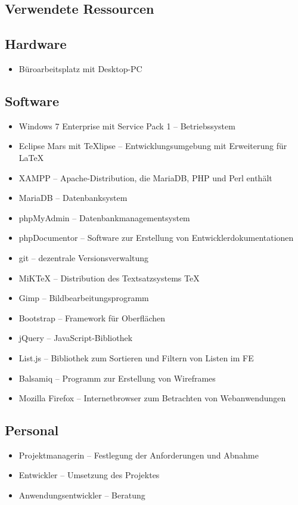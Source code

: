 \subsection{Verwendete Ressourcen}
\label{app:Verwendete Ressourcen}

\subsection*{Hardware}
\begin{itemize}
	\item Büroarbeitsplatz mit Desktop-PC
\end{itemize}

\subsection*{Software}
\begin{itemize}
	\item Windows 7 Enterprise mit Service Pack 1 -- Betriebssystem
	\item Eclipse Mars mit TeXlipse -- Entwicklungsumgebung mit Erweiterung für
	\LaTeX
	\item \acs{XAMPP} -- Apache-Distribution, die MariaDB, PHP und Perl enthält
	\item MariaDB -- Datenbanksystem
	\item phpMyAdmin -- Datenbankmanagementsystem
	\item phpDocumentor -- Software zur Erstellung von Entwicklerdokumentationen
	\item git -- dezentrale Versionsverwaltung
	\item MiKTeX -- Distribution des Textsatzsystems \TeX
	\item Gimp -- Bildbearbeitungsprogramm
	\item Bootstrap -- Framework für Oberflächen 
	\item jQuery -- JavaScript-Bibliothek
	\item List.js -- Bibliothek zum Sortieren und Filtern von Listen im \acs{FE}
	\item Balsamiq -- Programm zur Erstellung von Wireframes
	\item Mozilla Firefox -- Internetbrowser zum Betrachten von Webanwendungen
\end{itemize}

\subsection*{Personal}
\begin{itemize}
	\item Projektmanagerin -- Festlegung der Anforderungen und Abnahme  
	\item Entwickler -- Umsetzung des Projektes
	\item Anwendungsentwickler -- Beratung
\end{itemize}